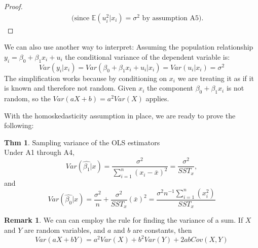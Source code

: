\documentclass[a4paper, 10pt]{article}
\theoremstyle{definition}	%
\newtheorem{theorem}{Thm}
\newtheorem*{remark}{Remark}
\begin{document}
\begin{enumerate}
\begin{proof}
\begin{align*}
        && \text{(since } \mathbb{E}(u_i^2|x_i) = \sigma^2 \text{ by assumption A5)}.
        \end{align*}
    \end{proof}
    We can also use another way to interpret: Assuming the population relationship $ y_i = \beta_0 + \beta_1 x_i + u_i$ the conditional variance of the dependent variable is:
    \begin{equation*}
        Var(y_i|x_i) = Var(\beta_0 + \beta_1 x_i + u_i|x_i) = Var(u_i|x_i) = \sigma^2
    \end{equation*}
    The simplification works because by conditioning on $x_i$ we are treating it as if it is known and therefore not random. Given $x_i$ the component $\beta_0 + \beta_1 x_i$ is not random, so the $Var(aX+b) = a^2Var(X)$ applies.
\end{enumerate}
With the homoskedasticity assumption in place, we are ready to prove the following:
\begin{theorem}
    Sampling variance of the OLS estimators\\
    Under A1 through A4,
    \begin{equation}
        Var(\hat{\beta_1}|x) = \frac{\sigma^2}{\sum_{i=1}^{n} \left(x_i - \bar{x}\right)^2} = \frac{\sigma^2}{SST_x},
    \end{equation}
    and
    \begin{equation}
         Var(\hat{\beta_0}|x) = \frac{\sigma^2}{n} + \frac{\sigma^2}{SST_x}(\bar{x})^2 = \frac{\sigma^2 n^{-1} \sum_{i=1}^{n} \left(x_i^2\right)}{SST_x}
    \end{equation}
\end{theorem}
\begin{remark}
    We can can employ the rule for finding the variance of a sum. If $X$ and $Y$ are random variables, and $a$ and $b$ are constants, then
    \begin{equation*}
        Var(aX+bY) = a^2Var(X) + b^2Var(Y) + 2abCov(X,Y) 
    \end{equation*}
\end{remark}
\end{document}
